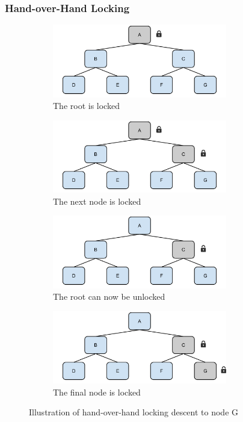 \documentclass[11pt,a4paper]{globis-book}
\begin{document}
\subsubsection{Hand-over-Hand Locking}

\begin{figure}[t]
    \centering
    \begin{subfigure}[b]{0.5\linewidth}
        \includegraphics[width = 3in]{images/Tree-HoH-a}
        \caption{The root is locked}
    \end{subfigure}%
    \begin{subfigure}[b]{0.5\linewidth}
        \includegraphics[width = 3in]{images/Tree-HoH-b}
        \caption{The next node is locked}
    \end{subfigure}
    \begin{subfigure}[b]{0.5\linewidth}
        \includegraphics[width = 3in]{images/Tree-HoH-c}
        \caption{The root can now be unlocked}
    \end{subfigure}%
    \begin{subfigure}[b]{0.5\linewidth}
        \includegraphics[width = 3in]{images/Tree-HoH-d}
        \caption{The final node is locked}
    \end{subfigure}
    \caption{Illustration of hand-over-hand locking descent to node G}
    \label{fig:locking-hoh}
\end{figure}
\end{document}
